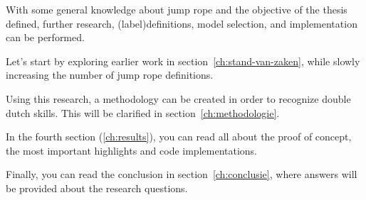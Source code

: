 
With some general knowledge about jump rope and the objective of the thesis defined, further research, (label)definitions, model selection, and implementation can be performed.

Let’s start by exploring earlier work in section~\ref{ch:stand-van-zaken}, while slowly increasing the number of jump rope definitions.

Using this research, a methodology can be created in order to recognize double dutch skills. This will be clarified in section~\ref{ch:methodologie}.

In the fourth section (\ref{ch:results}), you can read all about the proof of concept, the most important highlights and code implementations.

Finally, you can read the conclusion in section~\ref{ch:conclusie}, where answers will be provided about the research questions.

